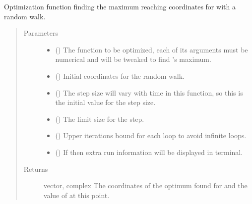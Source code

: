 \documentclass[letterpaper,10pt,english]{sphinxmanual}
\begin{document}
\begin{fulllineitems}
\label{\detokenize{opti:opti.optimize_normalized}}
Optimization function finding the maximum reaching coordinates for 
with a random walk.
\begin{quote}\begin{description}
\item[{Parameters}] \leavevmode\begin{itemize}
\item {} 
 () \textendash{} The function to be optimized, each of its arguments must 
be numerical and will be tweaked to find ’s maximum.

\item {} 
 () \textendash{} Initial coordinates for the random walk.

\item {} 
 () \textendash{} The step size will vary with time in this function, so
this is the initial value for the step size.

\item {} 
 () \textendash{} The limit size for the step.

\item {} 
 () \textendash{} Upper iterations bound for each loop to avoid infinite 
loops.

\item {} 
 () \textendash{} If  then extra run information will be 
displayed in terminal.

\end{itemize}

\item[{Returns}] \leavevmode
vector, complex \textendash{} The coordinates of the optimum found for 
 and the value of  at this point.

\end{description}\end{quote}

\end{fulllineitems}
\end{document}
